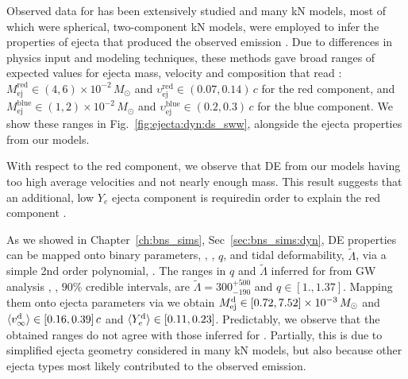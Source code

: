 Observed data for \AT{} has been extensively studied and many \ac{kN} models, most of which were spherical, two-component \ac{kN} models, 
were employed to infer the properties of ejecta that produced the observed 
emission \citep[\eg][]{Villar:2017wcc}. 
%
Due to differences in physics input and modeling techniques, these methods gave 
broad ranges of expected values for ejecta mass, velocity and composition 
that read \citep{Siegel:2019mlp}:
%
$M_{\text{ej}}^{\text{red}}\in(4, 6)\times10^{-2}\,M_{\odot}$ and
$\upsilon_{\text{ej}}^{\text{red}}\in(0.07, 0.14)\,c$ for the red component, and 
$M_{\text{ej}}^{\text{blue}}\in(1, 2)\times10^{-2}\,M_{\odot}$ and 
$\upsilon_{\text{ej}}^{\text{blue}}\in(0.2, 0.3)\,c$ for the blue component.
%
We show these ranges in Fig.~\ref{fig:ejecta:dyn:ds_sww}, alongside the 
ejecta properties from our models. 


With respect to the red component, we observe that \ac{DE} from our models 
having too high average velocities and not nearly enough mass.
This result suggests that an additional, low $Y_e$ ejecta component 
is requiredin order to explain the \AT{} red component 
\citep[\eg][]{Perego:2017wtu,Kawaguchi:2018ptg}.
%

As we showed in Chapter~\ref{ch:bns_sims}, Sec~\ref{sec:bns_sims:dyn}, 
\ac{DE} properties can be mapped onto binary parameters, \eg, 
\mr, $q$, and tidal deformability, $\tilde{\Lambda}$, via a simple 
2nd order polynomial, \polql{}. 
%
The ranges in $q$ and $\tilde{\Lambda}$ inferred for \GW{} from \ac{GW} analysis 
\citep{TheLIGOScientific:2017qsa,Abbott:2018wiz,De:2018uhw,Abbott:2018exr}, 
\ie,  $90\%$ credible intervals, are 
$\tilde{\Lambda}=300_{-190}^{+500}$ and $q\in[1., 1.37]$. 
%
Mapping them onto ejecta parameters via \polql{} we obtain 
%
$M^{\text{d}}_{\text{ej}} \in [0.72, 7.52] \times 10^{-3}\, M_{\odot}$
and
$\langle v^{\text{d}}_\infty\rangle \in [0.16, 0.39]\, c$
and 
$\langle Y^{\text{d}}_{e}\rangle \in [0.11, 0.23]$.
%
Predictably, we observe that the obtained ranges do not agree with those 
inferred for \AT{}. 
Partially, this is due to simplified ejecta 
geometry considered in many \ac{kN} models, but also because other 
ejecta types most likely contributed to the observed emission.

%








